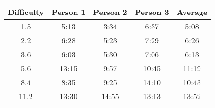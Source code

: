 \documentclass{report}
\begin{document}
\begin{center}
    \begin{tabular}{ |c|c c c|c| }
        \hline
        Difficulty & Person 1 & Person 2 & Person 3 & Average \\
        \hline
        1.5 & 5:13 & 3:34 & 6:37 & 5:08 \\
        2.2 & 6:28 & 5:23 & 7:29 & 6:26 \\
        3.6 & 6:03 & 5:30 & 7:06 & 6:13 \\
        5.6 & 13:15 & 9:57 & 10:45 & 11:19 \\
        8.4 & 8:35 & 9:25 & 14:10 & 10:43 \\
        11.2 & 13:30 & 14:55 & 13:13 & 13:52 \\
        \hline
    \end{tabular}
\end{center}
\end{document}
